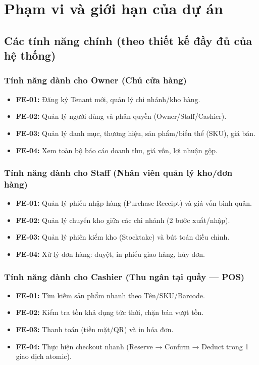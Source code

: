 \section{Phạm vi và giới hạn của dự án}
\label{sec:scope-limitations}

\subsection{Các tính năng chính (theo thiết kế đầy đủ của hệ thống)}

\subsubsection{Tính năng dành cho Owner (Chủ cửa hàng)}
\begin{itemize}
    \item \textbf{FE-01:} Đăng ký Tenant mới, quản lý chi nhánh/kho hàng.
    \item \textbf{FE-02:} Quản lý người dùng và phân quyền (Owner/Staff/Cashier).
    \item \textbf{FE-03:} Quản lý danh mục, thương hiệu, sản phẩm/biến thể (SKU), giá bán.
    \item \textbf{FE-04:} Xem toàn bộ báo cáo doanh thu, giá vốn, lợi nhuận gộp.
\end{itemize}

\subsubsection{Tính năng dành cho Staff (Nhân viên quản lý kho/đơn hàng)}
\begin{itemize}
    \item \textbf{FE-01:} Quản lý phiếu nhập hàng (Purchase Receipt) và giá vốn bình quân.
    \item \textbf{FE-02:} Quản lý chuyển kho giữa các chi nhánh (2 bước xuất/nhập).
    \item \textbf{FE-03:} Quản lý phiên kiểm kho (Stocktake) và bút toán điều chỉnh.
    \item \textbf{FE-04:} Xử lý đơn hàng: duyệt, in phiếu giao hàng, hủy đơn.
\end{itemize}

\subsubsection{Tính năng dành cho Cashier (Thu ngân tại quầy — POS)}
\begin{itemize}
    \item \textbf{FE-01:} Tìm kiếm sản phẩm nhanh theo Tên/SKU/Barcode.
    \item \textbf{FE-02:} Kiểm tra tồn khả dụng tức thời, chặn bán vượt tồn.
    \item \textbf{FE-03:} Thanh toán (tiền mặt/QR) và in hóa đơn.
    \item \textbf{FE-04:} Thực hiện checkout nhanh (Reserve → Confirm → Deduct trong 1 giao dịch atomic).
\end{itemize}

